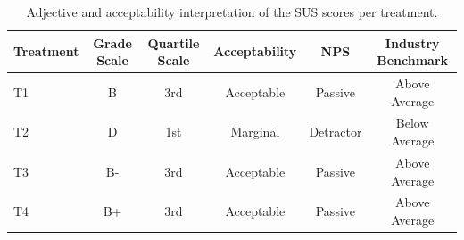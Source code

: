 \begin{table}[tbp]
\centering
\begin{tabular}{lccccc}
\toprule
Treatment & Grade Scale & Quartile Scale & Acceptability & NPS & Industry Benchmark \\ \midrule
T1 & B & 3rd & Acceptable & Passive & Above Average \\
T2 & D & 1st & Marginal & Detractor & Below Average \\
T3 & B- & 3rd & Acceptable & Passive & Above Average \\
T4 & B+ & 3rd & Acceptable & Passive & Above Average \\
\bottomrule
\end{tabular}
\caption{Adjective and acceptability interpretation of the SUS scores per treatment.}
\label{tab:sus-score-stats-1}
\end{table}
